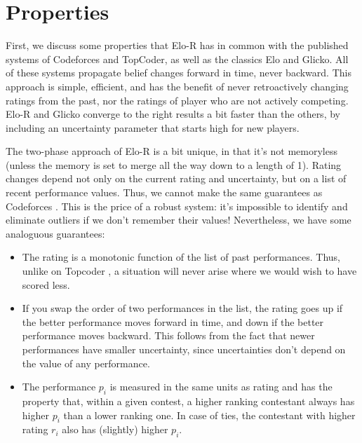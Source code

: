 \documentclass{article}
\begin{document}
\pagebreak

\section{Properties}

First, we discuss some properties that Elo-R has in common with the published systems of Codeforces and TopCoder, as well as the classics Elo and Glicko. All of these systems propagate belief changes forward in time, never backward. This approach is simple, efficient, and has the benefit of never retroactively changing ratings from the past, nor the ratings of player who are not actively competing. Elo-R and Glicko converge to the right results a bit faster than the others, by including an uncertainty parameter that starts high for new players.

The two-phase approach of Elo-R is a bit unique, in that it's not memoryless (unless the memory is set to merge all the way down to a length of 1). Rating changes depend not only on the current rating and uncertainty, but on a list of recent performance values. Thus, we cannot make the same guarantees as Codeforces \cite{Codeforces}. This is the price of a robust system: it's impossible to identify and eliminate outliers if we don't remember their values! Nevertheless, we have some analoguous guarantees:
\begin{itemize}
\item The rating is a monotonic function of the list of past performances. Thus, unlike on Topcoder \cite{forivsektheoretical}, a situation will never arise where we would wish to have scored less.
\item If you swap the order of two performances in the list, the rating goes up if the better performance moves forward in time, and down if the better performance moves backward. This follows from the fact that newer performances have smaller uncertainty, since uncertainties don't depend on the value of any performance.
\item The performance $p_i$ is measured in the same units as rating and has the property that, within a given contest, a higher ranking contestant always has higher $p_i$ than a lower ranking one. In case of ties, the contestant with higher rating $r_i$ also has (slightly) higher $p_i$.
\end{itemize}
\end{document}
